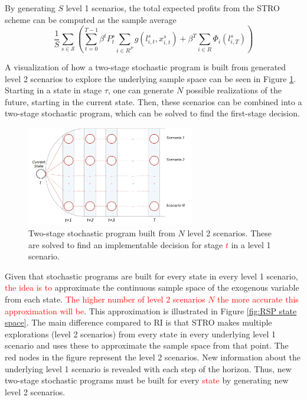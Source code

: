 By generating $S$ level 1 scenarios, the total expected profits from the STRO scheme can be computed as the sample average
\begin{equation}
    \frac{1}{S} \sum_{s \in \mathcal{S}} \left( \sum_{t=0}^{T-1}\beta^{t}P^{s}_{t}\sum_{i\in R^P}g(l^{s}_{i,t},x^{s}_{i,t}) + \beta^{T}\sum_{i\in R}\Phi_{i}(l^{s}_{i,T}) \right)
\end{equation}

\color{black}
A visualization of how a two-stage stochastic program is built from generated level 2 scenarios to explore the underlying sample space can be seen in Figure \ref{fig:explorations stochastic program}. Starting in a state in stage $\tau$, one can generate $N$ possible realizations of the future, starting in the current state. Then, these scenarios can be combined into a two-stage stochastic program, which can be solved to find the first-stage decision.

\begin{figure}[H]
    \centering
    \includegraphics[width=0.65\textwidth]{scenarioExplained.pdf}
    \caption{Two-stage stochastic program built from $N$ level 2 scenarios. These are solved to find an implementable decision for stage \textcolor{red}{$t$} in a level 1 scenario.}
    \label{fig:explorations stochastic program}
\end{figure}

Given that stochastic programs are built for every state in every level 1 scenario, \textcolor{red}{the idea is to} approximate the continuous sample space of the exogenous variable from each state. \textcolor{red}{The higher number of level 2 scenarios $N$ the more accurate this approximation will be}. This approximation is illustrated in Figure \ref{fig:RSP state space}. The main difference compared to RI is that STRO makes multiple explorations (level 2 scenarios) from every state in every underlying level 1 scenario and uses these to approximate the sample space from that point. 
The red nodes in the figure represent the level 2 scenarios. New information about the underlying level 1 scenario is revealed with each step of the horizon. Thus, new two-stage stochastic programs must be built for every \textcolor{red}{state}  by generating new level 2 scenarios. 

